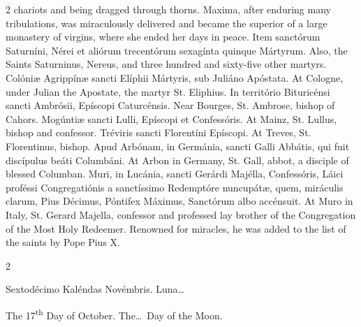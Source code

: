 \begin{paracol}{2}
 chariots and being dragged through thorns. Maxima, after enduring many 
 tribulations, was miraculously delivered and became the superior of a large 
 monastery of virgins, where she ended her days in peace.
\switchcolumn*
{}
Item sanctórum 
 Saturníni, Nérei et aliórum trecentórum sexagínta quinque Mártyrum.
\switchcolumn
{}
Also, the Saints Saturninus, Nereus, 
 and three hundred and sixty-five other martyrs.
\switchcolumn*
{}
Colóniæ Agrippínæ 
 sancti Elíphii Mártyris, sub Juliáno Apóstata.
\switchcolumn
{}
At Cologne, under Julian the 
 Apostate, the martyr St. Eliphius.
\switchcolumn*
{}
In território Bituricénsi sancti Ambrósii, Epíscopi Caturcénsis.
\switchcolumn
{}
Near Bourges, St. Ambrose, bishop of 
 Cahors.
\switchcolumn*
{}
Mogúntiæ sancti Lulli, 
 Epíscopi et Confessóris.
\switchcolumn
{}
At Mainz, St. Lullus, bishop and 
 confessor.
\switchcolumn*
{}
Tréviris sancti 
 Florentíni Epíscopi.
\switchcolumn
{}
At Treves, St. Florentinus, bishop.
\switchcolumn*
{}
Apud Arbónam, in 
 Germánia, sancti Galli Abbátis, qui fuit discípulus beáti Columbáni.
\switchcolumn
{}
At Arbon in Germany, St. Gall, 
 abbot, a disciple of blessed Columban.
\switchcolumn*
{}
Muri, in Lucánia, 
 sancti Gerárdi Majélla, Confessóris, Láici proféssi Congregatiónis a 
 sanctíssimo Redemptóre nuncupátæ, quem, miráculis clarum, Pius Décimus, 
 Póntifex Máximus, Sanctórum albo accénsuit.
\switchcolumn
{}
At Muro in Italy, St. Gerard Majella, 
 confessor and professed lay brother of the Congregation of the Most Holy 
 Redeemer. Renowned for miracles, he was added to the list of the 
 saints by Pope Pius X.
\switchcolumn*
{}
\end{paracol}


\begin{paracol}{2}
\begin{center}{\color{gregoriocolor} Sextodécimo Kaléndas Novémbris. 
 Luna\dots\ }\end{center}
\switchcolumn
{}
\begin{center}{\color{gregoriocolor} The   17\textsuperscript{th} Day of 
 October. The\dots\ Day of the Moon.}\end{center}
\end{paracol}

